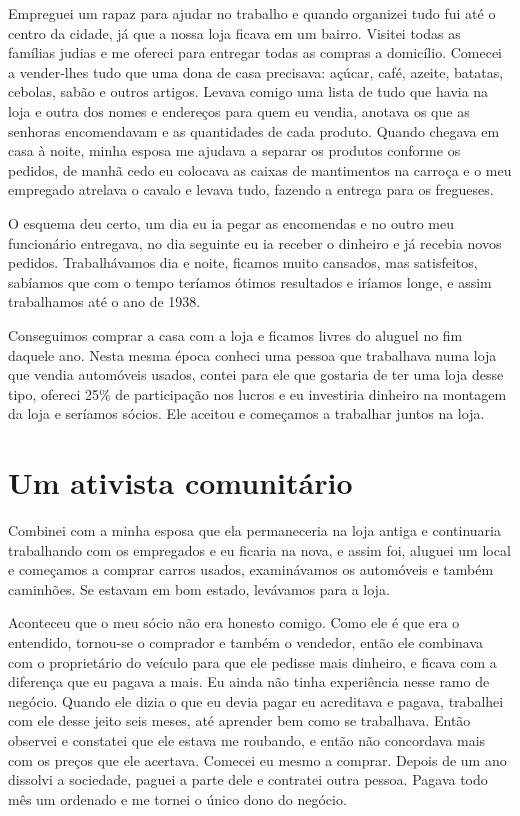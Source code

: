 Empreguei um rapaz para ajudar no trabalho e quando organizei tudo fui
até o centro da cidade, já que a nossa loja ficava em um bairro. Visitei
todas as famílias judias e me ofereci para entregar todas as compras a
domicílio. Comecei a vender-lhes tudo que uma dona de casa precisava:
açúcar, café, azeite, batatas, cebolas, sabão e outros artigos. Levava
comigo uma lista de tudo que havia na loja e outra dos nomes e endereços
para quem eu vendia, anotava os que as senhoras encomendavam e as
quantidades de cada produto. Quando chegava em casa à noite, minha
esposa me ajudava a separar os produtos conforme os pedidos, de manhã
cedo eu colocava as caixas de mantimentos na carroça e o meu empregado
atrelava o cavalo e levava tudo, fazendo a entrega para os fregueses.

O esquema deu certo, um dia eu ia pegar as encomendas e no outro meu
funcionário entregava, no dia seguinte eu ia receber o dinheiro e já
recebia novos pedidos. Trabalhávamos dia e noite, ficamos muito
cansados, mas satisfeitos, sabíamos que com o tempo teríamos ótimos
resultados e iríamos longe, e assim trabalhamos até o ano de 1938.

Conseguimos comprar a casa com a loja e ficamos livres do aluguel no fim
daquele ano. Nesta mesma época conheci uma pessoa que trabalhava numa
loja que vendia automóveis usados, contei para ele que gostaria de ter
uma loja desse tipo, ofereci 25\% de participação nos lucros e eu
investiria dinheiro na montagem da loja e seríamos sócios. Ele aceitou e
começamos a trabalhar juntos na loja.

\chapter{Um ativista comunitário}

Combinei com a minha esposa que ela permaneceria na loja antiga e
continuaria trabalhando com os empregados e eu ficaria na nova, e assim
foi, aluguei um local e começamos a comprar carros usados, examinávamos
os automóveis e também caminhões. Se estavam em bom estado, levávamos
para a loja.

Aconteceu que o meu sócio não era honesto comigo. Como ele é que era o
entendido, tornou-se o comprador e também o vendedor, então ele
combinava com o proprietário do veículo para que ele pedisse mais
dinheiro, e ficava com a diferença que eu pagava a mais. Eu ainda não
tinha experiência nesse ramo de negócio. Quando ele dizia o que eu devia
pagar eu acreditava e pagava, trabalhei com ele desse jeito seis meses,
até aprender bem como se trabalhava. Então observei e constatei que ele
estava me roubando, e então não concordava mais com os preços que ele
acertava. Comecei eu mesmo a comprar. Depois de um ano dissolvi a
sociedade, paguei a parte dele e contratei outra pessoa. Pagava todo mês
um ordenado e me tornei o único dono do negócio.

